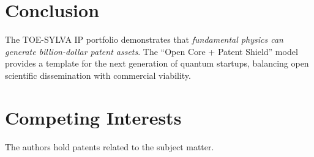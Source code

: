 \documentclass[12pt]{article}
\begin{document}
\section{Conclusion}
\label{sec:conclusion}

The TOE-SYLVA IP portfolio demonstrates that \emph{fundamental physics can generate billion-dollar patent assets}. The ``Open Core + Patent Shield'' model provides a template for the next generation of quantum startups, balancing open scientific dissemination with commercial viability.

\section*{Competing Interests}
The authors hold patents related to the subject matter.



\end{document}
